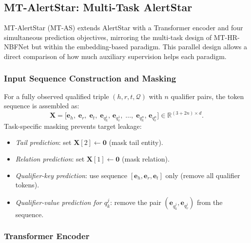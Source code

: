\documentclass[10pt,journal,compsoc]{IEEEtran}
\begin{document}
\subsection{MT-AlertStar: Multi-Task AlertStar}
\label{ssec:mtas}

MT-AlertStar (MT-AS) extends AlertStar with a Transformer
encoder and four simultaneous prediction objectives,
mirroring the multi-task design of MT-HR-NBFNet but within
the embedding-based paradigm.
This parallel design allows a direct comparison of how
much auxiliary supervision helps each paradigm.

\subsubsection{Input Sequence Construction and Masking}
\label{sssec:mtas_input}

For a fully observed qualified triple
$(h, r, t, \mathcal{Q})$ with $n$ qualifier pairs,
the token sequence is assembled as:
\begin{equation}
  \mathbf{X}
  = \bigl[
      \mathbf{e}_h,\;
      \mathbf{e}_r,\;
      \mathbf{e}_t,\;
      \mathbf{e}_{q_k^1},\, \mathbf{e}_{q_v^1},\;
      \ldots,\;
      \mathbf{e}_{q_k^n},\, \mathbf{e}_{q_v^n}
    \bigr]
  \in \mathbb{R}^{(3+2n)\times d}.
  \label{eq:mt_input}
\end{equation}
Task-specific masking prevents target leakage:
\begin{itemize}
  \item \emph{Tail prediction}:
    set $\mathbf{X}[2] \leftarrow \mathbf{0}$
    (mask tail entity).
  \item \emph{Relation prediction}:
    set $\mathbf{X}[1] \leftarrow \mathbf{0}$
    (mask relation).
  \item \emph{Qualifier-key prediction}:
    use sequence $[\mathbf{e}_h, \mathbf{e}_r,
    \mathbf{e}_t]$ only (remove all qualifier tokens).
  \item \emph{Qualifier-value prediction for $q_k^j$}:
    remove the pair
    $(\mathbf{e}_{q_k^j}, \mathbf{e}_{q_v^j})$
    from the sequence.
\end{itemize}

\subsubsection{Transformer Encoder}
\label{sssec:mtas_enc}
\end{document}
